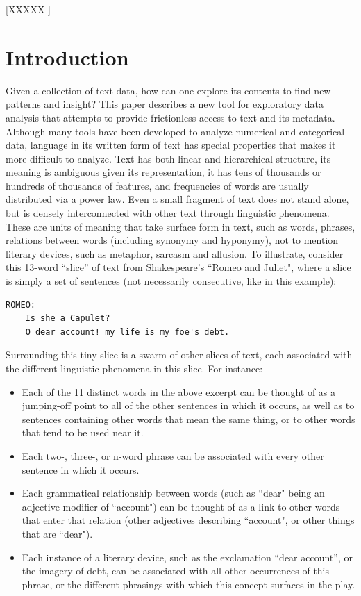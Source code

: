 \documentclass{sig-alternate}
\begin{document}

[XXXXX ]


\section{Introduction}
Given a collection of text data, how can one explore its contents to find new patterns and insight?  This paper describes a new tool for exploratory data analysis \cite{tukey} that attempts to provide frictionless access to text and its metadata.  Although many tools have been developed to analyze numerical and categorical data, language in its written form of text has special properties that makes it more difficult to analyze. Text has both linear and hierarchical structure, its meaning is ambiguous given its representation, it has tens of thousands or hundreds of thousands of features, and frequencies of words are usually distributed via a power law.   Even a small fragment of text does not stand alone, but is densely interconnected with other text through linguistic phenomena.  These are units of meaning that take surface form in text, such as words, phrases, relations between words (including synonymy and hyponymy), not to mention literary devices, such as metaphor, sarcasm and allusion. To illustrate, consider this 13-word ``slice'' of text from Shakespeare's ``Romeo and Juliet", where a slice is simply a set of sentences (not necessarily consecutive, like in this example):

\begin{verbatim}
ROMEO:
    Is she a Capulet?
    O dear account! my life is my foe's debt.
\end{verbatim}

Surrounding this tiny slice is a swarm of other slices of text, each associated with the different linguistic phenomena in this slice. For instance:
\begin{itemize}
\item Each of the 11 distinct words in the above excerpt can be thought of as a jumping-off point to all of the other sentences in which it occurs, as well as to sentences containing other words that mean the same thing, or to other words that tend to be used near it.
\item Each  two-, three-, or n-word phrase can be associated with every other sentence in which it occurs.
\item  Each grammatical relationship between words (such as ``dear" being an adjective modifier of  ``account") can be thought of as a link to other words that enter that relation (other adjectives describing ``account", or other things that are ``dear").
\item Each instance of a literary device, such as the exclamation ``dear account'', or the imagery of debt, can be associated with all other occurrences of this phrase, or the different phrasings with which this concept surfaces in the play.
\end{itemize}
\end{document}
